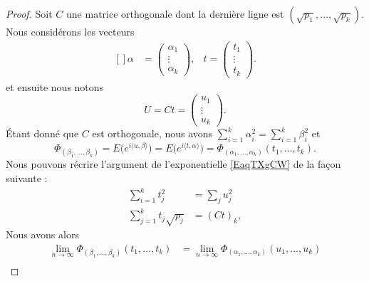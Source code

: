 \begin{proof}
    Soit \( C\) une matrice orthogonale dont la dernière ligne est \( (\sqrt{p_1},\ldots, \sqrt{p_k})\). Nous considérons les vecteurs
    \begin{equation}
        \begin{aligned}[]
            \alpha&=\begin{pmatrix}
                \alpha_1    \\
                \vdots    \\
                \alpha_k
            \end{pmatrix},
            &t=\begin{pmatrix}
                t_1    \\
                \vdots    \\
                t_k
            \end{pmatrix}.
        \end{aligned}
    \end{equation}
    et ensuite nous notons
    \begin{equation}
        U=Ct=\begin{pmatrix}
            u_1    \\
            \vdots    \\
            u_k
        \end{pmatrix}.
    \end{equation}
    Étant donné que \( C\) est orthogonale, nous avons \( \sum_{i=1}^k\alpha_i^2=\sum_{i=1}^k\beta_i^2\) et
    \begin{equation}
        \Phi_{(\beta_1,\ldots, \beta_k)}=E\big(  e^{i\langle u, \beta\rangle } \big)=E\big(  e^{i\langle t, \alpha\rangle } \big)=\Phi_{(\alpha_1,\ldots, \alpha_k)}(t_1,\ldots, t_k).
    \end{equation}
    Nous pouvons récrire l'argument de l'exponentielle \eqref{EaqTXgCW} de la façon suivante :
    \begin{subequations}
        \begin{align}
            \sum_{i=1}^kt_j^2&=\sum_ju_j^2\\
            \sum_{j=1}^kt_j\sqrt{p_j}&=(Ct)_{k},
        \end{align}
    \end{subequations}
    Nous avons alors
    \begin{subequations}
        \begin{align}
            \lim_{n\to \infty} \Phi_{(\beta_1,\ldots, \beta_k)}(t_1,\ldots, t_k)&=\lim_{n\to \infty} \Phi_{(\alpha_1,\ldots, \alpha_k)}(u_1,\ldots, u_k)\\

\end{align}
\end{subequations}
\end{proof}
